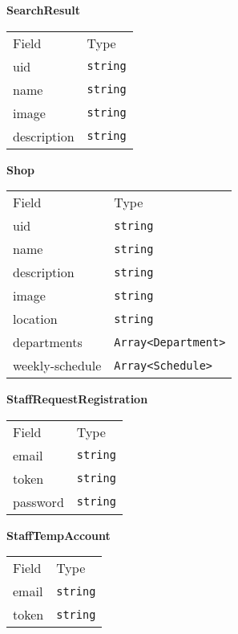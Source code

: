     \begin{table}[H]
    \centering
    \textbf{SearchResult}\\
    \everyrow{\tabucline[0.5pt]-}
    \begin{tabu} to 0.55\textwidth {|X|X|} \hline
    Field & Type \\
    uid & \texttt{string} \\
name & \texttt{string} \\
image & \texttt{string} \\
description & \texttt{string} \\
\end{tabu}
\end{table}


    \begin{table}[H]
    \centering
    \textbf{Shop}\\
    \everyrow{\tabucline[0.5pt]-}
    \begin{tabu} to 0.55\textwidth {|X|X|} \hline
    Field & Type \\
    uid & \texttt{string} \\
name & \texttt{string} \\
description & \texttt{string} \\
image & \texttt{string} \\
location & \texttt{string} \\
departments & \texttt{Array<Department>} \\
weekly-schedule & \texttt{Array<Schedule>} \\
\end{tabu}
\end{table}


    \begin{table}[H]
    \centering
    \textbf{StaffRequestRegistration}\\
    \everyrow{\tabucline[0.5pt]-}
    \begin{tabu} to 0.55\textwidth {|X|X|} \hline
    Field & Type \\
    email & \texttt{string} \\
token & \texttt{string} \\
password & \texttt{string} \\
\end{tabu}
\end{table}


    \begin{table}[H]
    \centering
    \textbf{StaffTempAccount}\\
    \everyrow{\tabucline[0.5pt]-}
    \begin{tabu} to 0.55\textwidth {|X|X|} \hline
    Field & Type \\
    email & \texttt{string} \\
token & \texttt{string} \\
\end{tabu}
\end{table}


